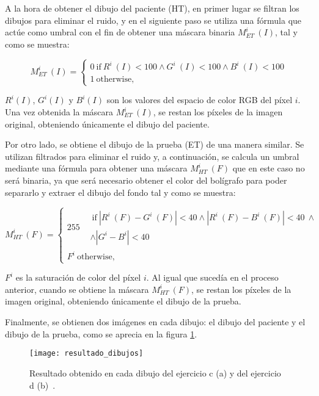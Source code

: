 A la hora de obtener el dibujo del paciente (HT), en primer lugar se filtran los dibujos para eliminar el ruido, y en el siguiente paso se utiliza una fórmula que actúe como umbral con el fin de obtener una máscara binaria \(M^{i}_{ET}\ (I)\), tal y como se muestra: 

\begin{equation}
	M^{i}_{ET}\ (I) = \left\lbrace\begin{array}{ll}
0~\text{if}~R^{i}~(I)<100\wedge G^{i}~(I)<100\wedge B^{i}~(I)<100 \\ 1~\text{otherwise,} \end{array}\right.
\end{equation}

\(R^{i}(I)\), \(G^{i}(I)\) y \(B^{i}(I)\) son los valores del espacio de color RGB del píxel \(i\). Una vez obtenida la máscara \(M^{i}_{ET}\ (I)\), se restan los píxeles de la imagen original, obteniendo únicamente el dibujo del paciente.

Por otro lado, se obtiene el dibujo de la prueba (ET) de una manera similar. Se utilizan filtrados para eliminar el ruido y, a continuación, se calcula un umbral mediante una fórmula para obtener una máscara \(M^{i}_{HT}\ (F)\) que en este caso no será binaria, ya que será necesario obtener el color del bolígrafo para poder separarlo y extraer el dibujo del fondo tal y como se muestra:
 
\begin{equation}
	M^{i}_{HT}\ (F) = \left\lbrace\begin{array}{ll}
		255\begin{split}&~\text{if}~|R^{i}~(F)-G^{i}~(F)|<40\wedge |R^{i}~(F)-B^{i}~(F)|<40~\wedge \\ & \wedge|G^{i}-B^{i}|<40 \end{split} \\ F^i~\text{otherwise,} \end{array}\right.
\end{equation}

\(F^{i}\) es la saturación de color del píxel \(i\). Al igual que sucedía en el proceso anterior, cuando se  obtiene la máscara \(M^{i}_{HT}\ (F)\), se restan los píxeles de la imagen original, obteniendo únicamente el dibujo de la prueba.

Finalmente, se obtienen dos imágenes en cada dibujo: el dibujo del paciente y el dibujo de la prueba, como se aprecia en la figura \ref{fig:resultado}.

\begin{figure}[ht]
	\texttt{[image: resultado\_dibujos]}
	\caption[Resultado obtenido en cada dibujo de los ejercicios c y d.]{Resultado obtenido en cada dibujo del ejercicio c (a) y del ejercicio d (b)~\cite{pereira2016new}.}
	\label{fig:resultado}
\end{figure}

